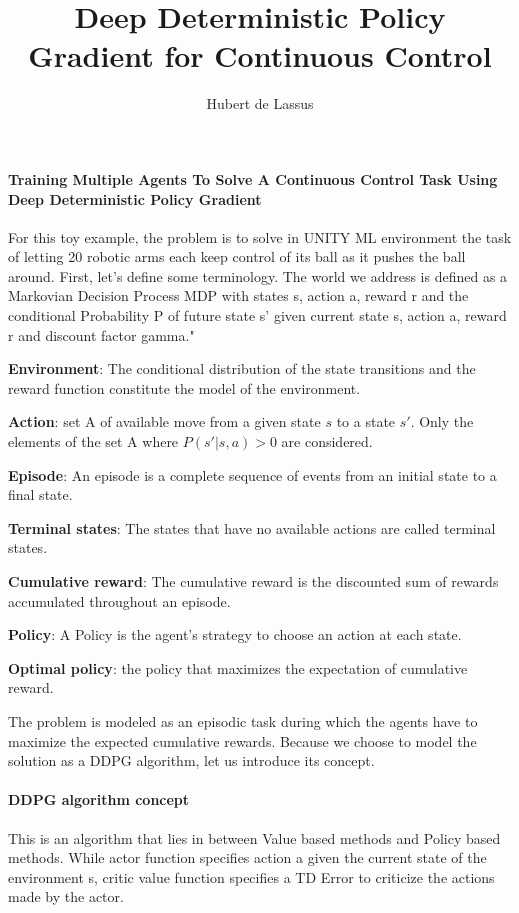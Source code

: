 \documentclass[11pt]{amsart}
\title{Deep Deterministic Policy Gradient for Continuous Control}
\author{Hubert de Lassus}
\begin{document}
\maketitle
\paragraph{\textbf{Training Multiple Agents To Solve A Continuous Control Task Using Deep Deterministic Policy Gradient}}

\begin{flushleft}

For this toy example, the problem is to solve in UNITY ML environment the task of letting 20 robotic arms each keep control of its ball as it pushes the ball around.
First, let's define some terminology.
The world we address is defined as a Markovian Decision Process MDP with states s, action a, reward r and the conditional Probability P
of future state s' given current state s, action a, reward r and discount factor gamma."
\end{flushleft}

\textbf{Environment}: The conditional distribution of the state transitions and the reward function constitute the model of the environment.

\textbf{Action}: set A of available move from a given state $s$ to a state $s'$. Only the elements of the set A where $P(s'|s,a) > 0$ are considered. 

\textbf{Episode}: An episode is a complete sequence of events from an initial state to a final state.

\textbf{Terminal states}: The states that have no available actions are called terminal states.

\textbf{Cumulative reward}: The cumulative reward is the discounted sum of rewards accumulated throughout an episode.

\textbf{Policy}: A Policy is the agent’s strategy to choose an action at each state.

\textbf{Optimal policy}: the policy that maximizes the expectation of cumulative reward.

The problem is modeled as an episodic task during which the agents have to maximize the expected cumulative rewards.
Because we choose to model the solution as a DDPG algorithm, let us introduce its concept.
\paragraph{\textbf{DDPG algorithm concept}}
This is an algorithm that lies in between Value based methods and Policy based methods.
While actor function  specifies action a given the current state of the environment s, critic value function specifies a TD Error to criticize the actions made by the actor.
\end{document}
